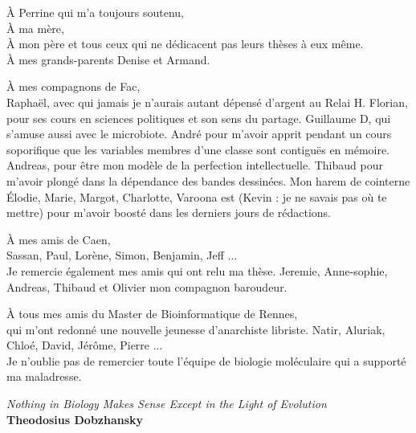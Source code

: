 \documentclass[12pt,a4paper]{article}
\begin{document}
\begin{flushleft}

À Perrine qui m'a toujours soutenu, \\ 
\vspace{0.5cm}
À ma mère, \\
À mon père et tous ceux qui ne dédicacent pas leurs thèses à eux même. \\ 
À mes grands-parents Denise et Armand. \\ 

\vspace{0.5cm}



\vspace{1cm}

À mes compagnons de Fac,\\
Raphaël, avec qui jamais je n'aurais autant dépensé d'argent au Relai H. Florian, pour ses cours en sciences politiques et son sens du partage. Guillaume D,  qui s'amuse aussi avec le microbiote. André pour m'avoir apprit pendant un cours soporifique que les variables membres d'une classe sont contiguës en mémoire. Andreas, pour être mon modèle de la perfection intellectuelle. Thibaud pour m'avoir plongé dans la dépendance des bandes dessinées. Mon harem de cointerne Élodie, Marie, Margot, Charlotte, Varoona est (Kevin : je ne savais pas où te mettre) pour m'avoir boosté dans les derniers jours de rédactions. 

\vspace{0.5cm}
À mes amis de Caen, \\
Sassan, Paul, Lorène, Simon, Benjamin, Jeff ...\\
Je remercie également mes amis qui ont relu ma thèse. Jeremie, Anne-sophie, Andreas, Thibaud et Olivier mon compagnon baroudeur. \\

\vspace{0.5cm}

À tous mes amis du Master de Bioinformatique de Rennes, \\
qui m'ont redonné une nouvelle jeunesse d'anarchiste libriste. Natir, Aluriak, Chloé, David, Jérôme, Pierre ... \\

\vspace{0.5cm}
Je n'oublie pas de remercier toute l'équipe de biologie moléculaire qui a supporté ma maladresse. \\ 
\vspace{5.0cm}


\centering\textit{Nothing in Biology Makes Sense Except in the Light of Evolution}\\
\centering \textbf{Theodosius Dobzhansky}
\vspace{0.5cm}

\end{flushleft}
\newpage
\tableofcontents
\newpage
\listoffigures
\newpage
\listoftables
\newpage
\end{document}

